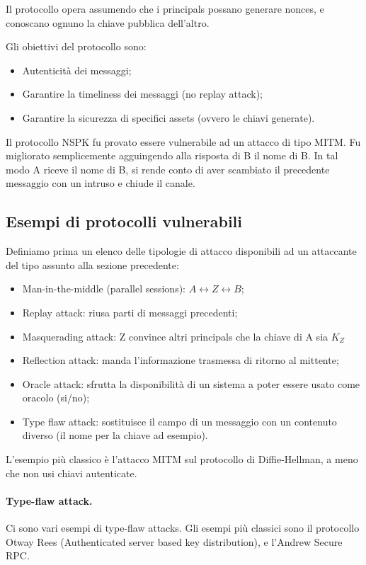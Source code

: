 \documentclass[a4paper, 11pt, twoside]{article}
\begin{document}
	Il protocollo opera assumendo che i principals possano generare nonces, e conoscano ognuno la chiave pubblica dell'altro.

	Gli obiettivi del protocollo sono:
	\begin{itemize}
		\item Autenticità dei messaggi;
		\item Garantire la timeliness dei messaggi (no replay attack);
		\item Garantire la sicurezza di specifici assets (ovvero le chiavi generate).
	\end{itemize}

	Il protocollo NSPK fu provato essere vulnerabile ad un attacco di tipo MITM. Fu migliorato semplicemente agguingendo alla risposta di B il nome di B. In tal modo A riceve il nome di B, si rende conto di aver scambiato il precedente messaggio con un intruso e chiude il canale.
	
	\subsection{Esempi di protocolli vulnerabili}
	Definiamo prima un elenco delle tipologie di attacco disponibili ad un attaccante del tipo assunto alla sezione precedente:
	\begin{itemize}
		\item Man-in-the-middle (parallel sessions): $A \leftrightarrow Z \leftrightarrow B$;
		\item Replay attack: riusa parti di messaggi precedenti;
		\item Masquerading attack: Z convince altri principals che la chiave di A sia $K_Z$
		\item Reflection attack: manda l'informazione trasmessa di ritorno al mittente;
		\item Oracle attack: sfrutta la disponibilità di un sistema a poter essere usato come oracolo (si/no);
		\item Type flaw attack: sostituisce il campo di un messaggio con un contenuto diverso (il nome per la chiave ad esempio).
	\end{itemize}
	
	L'esempio più classico è l'attacco MITM sul protocollo di Diffie-Hellman, a meno che non usi chiavi autenticate.

	\paragraph{Type-flaw attack.} Ci sono vari esempi di type-flaw attacks.
	Gli esempi più classici sono il protocollo Otway Rees (Authenticated server based key distribution), e l'Andrew Secure RPC.
\end{document}
